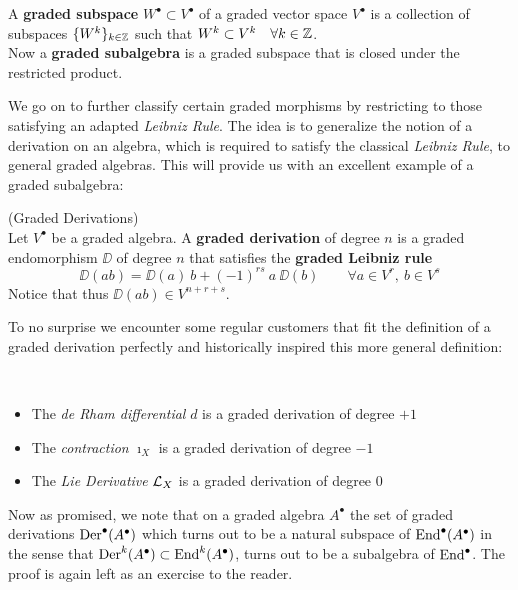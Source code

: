 \begin{definition}
  A \textbf{graded subspace} $W^\bullet \subset V^\bullet$ of a graded vector space $V^\bullet$ is a collection of subspaces $\{ W^k \}_{k\in\mathbb{Z}}$ such that $W^k \subset V^k \quad \forall k \in \mathbb{Z}$.\\
  Now a \textbf{graded subalgebra} is a graded subspace that is closed under the restricted product.
\end{definition}

We go on to further classify certain graded morphisms by restricting to those satisfying an adapted \emph{Leibniz Rule}. The idea is to generalize the notion of a derivation on an algebra, which is required to satisfy the classical \emph{Leibniz Rule}, to general graded algebras. This will provide us with an excellent example of a graded subalgebra:

\begin{definition} (Graded Derivations)\\
  Let $V^\bullet$ be a graded algebra. A \textbf{graded derivation} of degree $n$ is a graded endomorphism $\DD$ of degree $n$ that satisfies the \textbf{graded Leibniz rule}
  $$ \DD (ab) = \DD(a) \ b + (-1)^{rs} \ a \ \DD(b) \quad \quad \forall a \in V^r, \ b \in V^s $$
  Notice that thus $\DD(ab) \in V^{n+r+s}$.
\end{definition}

To no surprise we encounter some regular customers that fit the definition of a graded derivation perfectly and historically inspired this more general definition:

\begin{example}~
  \begin{itemize}
    \item The \emph{de Rham differential} $d$ is a graded derivation of degree $+1$
    \item The \emph{contraction} $\imath_X$ is a graded derivation of degree $-1$
    \item The \emph{Lie Derivative} $\mathcal{L}_{X}$ is a graded derivation of degree $0$
  \end{itemize}
\end{example}

Now as promised, we note that on a graded algebra $A^\bullet$ the set of graded derivations $\operatorname{Der}^\bullet(A^\bullet)$ which turns out to be a natural subspace of $\operatorname{End}^\bullet(A^\bullet)$ in the sense that $\operatorname{Der}^k(A^\bullet) \subset \operatorname{End}^k(A^\bullet)$, turns out to be a subalgebra of $\operatorname{End}^\bullet$. The proof is again left as an exercise to the reader.\\

